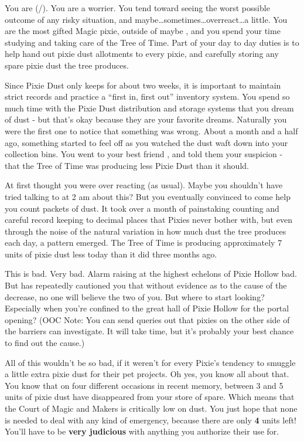 \documentclass[char]{PP}
\begin{document}
\name{\cMTree{}}

You are \cMTree{} (\cMTree{\They}/\cMTree{\Them}). You are a worrier. You tend toward seeing the worst possible outcome of any risky situation, and maybe\ldots sometimes\ldots overreact\ldots a little. You are the most gifted Magic pixie, outside of maybe \cMHead{} \cMHead{\themself}, and you spend your time studying and taking care of the Tree of Time. Part of your day to day duties is to help hand out pixie dust allotments to every pixie, and carefully storing any spare pixie dust the tree produces.

Since Pixie Dust only keeps for about two weeks, it is important to maintain strict records and practice a “first in, first out” inventory system. You spend so much time with the Pixie Dust distribution and storage systems that you dream of dust - but that’s okay because they are your favorite dreams. Naturally you were the first one to notice that something was wrong. About a month and a half ago, something started to feel off as you watched the dust waft down into your collection bins. You went to your best friend \cSHelp{}, and told them your suspicion - that the Tree of Time was producing less Pixie Dust than it should.

At first \cSHelp{} thought you were over reacting (as usual). Maybe you shouldn’t have tried talking to at 2 am about this? But you eventually convinced \cSHelp{\them} to come help you count packets of dust. It took over a month of painstaking counting and careful record keeping to decimal places that Pixies never bother with, but even through the noise of the natural variation in how much dust the tree produces each day, a pattern emerged. The Tree of Time is producing approximately 7 units of pixie dust less today than it did three months ago.

This is bad. Very bad. Alarm raising at the highest echelons of Pixie Hollow bad. But \cSHelp{} has repeatedly cautioned you that without evidence as to the cause of the decrease, no one will believe the two of you. But where to start looking? Especially when you’re confined to the great hall of Pixie Hollow for the portal opening? (OOC Note: You can send queries out that pixies on the other side of the barriers can investigate. It will take time, but it’s probably your best chance to find out the cause.)

All of this wouldn’t be so bad, if it weren’t for every Pixie’s tendency to smuggle a little extra pixie dust for their pet projects. Oh yes, you know all about that. You know that on four different occasions in recent memory, between 3 and 5 units of pixie dust have disappeared from your store of spare. Which means that the Court of Magic and Makers is critically low on dust. You just hope that none is needed to deal with any kind of emergency, because there are only \textbf{4} units left! You’ll have to be \textbf{very judicious} with anything you authorize their use for.
\end{document}
